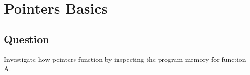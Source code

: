 \section{Pointers Basics}
    \subsection*{Question}
        Investigate how pointers function by inspecting the program memory
        for function A.